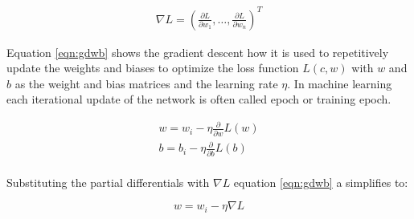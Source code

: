 \begin{eqnarray}
 \nabla L = \left(\frac{\partial L}{\partial w_1}, \ldots ,
 \frac{\partial L}{\partial w_n}\right)^T
 \label{eqn:gd}
\end{eqnarray}


Equation \ref{eqn:gdwb} shows the gradient descent how it is used to repetitively update the weights and biases to optimize the loss function $L(c,w)$ with $w$ and $b$ as the weight and bias matrices and the learning rate $\eta$. In machine learning each iterational update of the network is often called epoch or training epoch. 

\begin{subequations}
 \begin{align}
   w = w_i - \eta \frac{\partial}{\partial w}L(w) \\
   b = b_i - \eta \frac{\partial}{\partial b}L(b) \\
 \end{align}
 \label{eqn:gdwb}
\end{subequations}

Substituting the partial differentials with $\nabla L$ equation \ref{eqn:gdwb} a  simplifies to:

\begin{equation}
  w = w_i - \eta  \nabla L
\label{eqn:simplegd}  
\end{equation}




